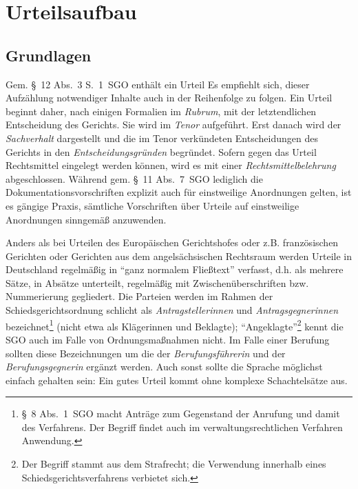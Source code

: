 
\chapter{Urteilsaufbau}
\label{Urteilsaufbau}

\section{Grundlagen}
\label{Urteilsaufbau:Grundlagen}
Gem. \S~12 Abs.~3 S.~1~SGO enthält ein Urteil 
Es empfiehlt sich, dieser Aufzählung notwendiger Inhalte auch in der Reihenfolge zu folgen.
Ein Urteil beginnt daher, nach einigen Formalien im \emph{Rubrum}, mit der letztendlichen Entscheidung des Gerichts.
Sie wird im \emph{Tenor} aufgeführt.
Erst danach wird der \emph{Sachverhalt} dargestellt und die im Tenor verkündeten Entscheidungen des Gerichts in den \emph{Entscheidungsgründen} begründet.
Sofern gegen das Urteil Rechtsmittel eingelegt werden können, wird es mit einer \emph{Rechtsmittelbelehrung} abgeschlossen.
Während gem. \S~11 Abs.~7~SGO lediglich die Dokumentationsvorschriften explizit auch für einstweilige Anordnungen gelten, ist es gängige Praxis, sämtliche Vorschriften über Urteile auf einstweilige Anordnungen sinngemäß anzuwenden.

Anders als bei Urteilen des Europäischen Gerichtshofes oder z.B. französischen Gerichten oder Gerichten aus dem angelsächsischen Rechtsraum werden Urteile in Deutschland regelmäßig in \enquote{ganz normalem Fließtext} verfasst, d.h. als mehrere Sätze, in Absätze unterteilt, regelmäßig mit Zwischenüberschriften bzw. Nummerierung gegliedert.
Die Parteien werden im Rahmen der Schiedsgerichtsordnung schlicht als \emph{Antragstellerinnen} und \emph{Antragsgegnerinnen} bezeichnet\footnote{\S~8 Abs.~1~SGO macht Anträge zum Gegenstand der Anrufung und damit des Verfahrens. Der Begriff findet auch im verwaltungsrechtlichen Verfahren Anwendung.} (nicht etwa als Klägerinnen und Beklagte); \enquote{Angeklagte}\footnote{Der Begriff stammt aus dem Strafrecht; die Verwendung innerhalb eines Schiedsgerichtsverfahrens verbietet sich.} kennt die SGO auch im Falle von Ordnungsmaßnahmen nicht.
Im Falle einer Berufung sollten diese Bezeichnungen um die der \emph{Berufungsführerin} und der \emph{Berufungsgegnerin} ergänzt werden.
Auch sonst sollte die Sprache möglichst einfach gehalten sein:
Ein gutes Urteil kommt ohne komplexe Schachtelsätze aus.

